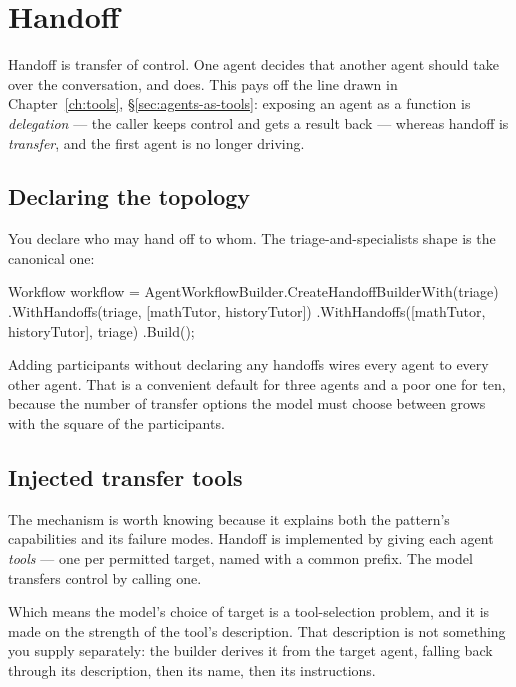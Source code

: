 \section{Handoff}
\label{sec:orch-handoff}

Handoff is transfer of control. One agent decides that another agent should take
over the conversation, and does. This pays off the line drawn in
Chapter~\ref{ch:tools}, \S\ref{sec:agents-as-tools}: exposing an agent as a
function is \emph{delegation}
--- the caller keeps control and gets a result back --- whereas handoff is
\emph{transfer}, and the first agent is no longer driving.

\subsection{Declaring the topology}

You declare who may hand off to whom. The triage-and-specialists shape is the
canonical one:

\begin{csharp}[caption={A handoff topology}, label={lst:orch-handoff}]
Workflow workflow = AgentWorkflowBuilder.CreateHandoffBuilderWith(triage)
    .WithHandoffs(triage, [mathTutor, historyTutor])
    .WithHandoffs([mathTutor, historyTutor], triage)
    .Build();
\end{csharp}

Adding participants without declaring any handoffs wires every agent to every
other agent. That is a convenient default for three agents and a poor one for
ten, because the number of transfer options the model must choose between grows
with the square of the participants.

\subsection{Injected transfer tools}

The mechanism is worth knowing because it explains both the pattern's
capabilities and its failure modes. Handoff is implemented by giving each agent
\emph{tools} --- one per permitted target, named with a common prefix. The model
transfers control by calling one.

Which means the model's choice of target is a tool-selection problem, and it is
made on the strength of the tool's description. That description is not something
you supply separately: the builder derives it from the target agent, falling back
through its description, then its name, then its instructions.

